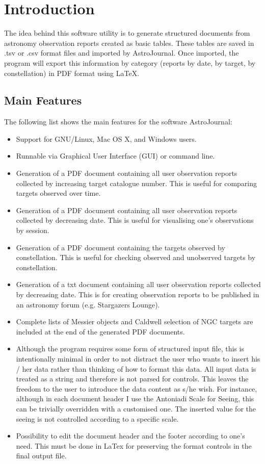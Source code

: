 \section{Introduction}
\label{sec:Introduction}
The idea behind this software utility is to generate structured documents 
from astronomy observation reports created as basic tables. These tables 
are saved in .tsv or .csv format files and imported by AstroJournal. Once imported, the program will export this information by category (reports by date, by target, by constellation) in PDF format using LaTeX.


\subsection{Main Features}
\label{subsec:Main Features}
The following list shows the main features for the software AstroJournal:
\begin{itemize}
 \item Support for GNU/Linux, Mac OS X, and Windows users.
 \item Runnable via Graphical User Interface (GUI) or command line.
 \item Generation of a PDF document containing all user observation reports collected by increasing target catalogue number. This is useful for comparing targets observed over time.
 \item Generation of a PDF document containing all user observation reports collected by decreasing date. This is useful for visualising one's observations by session.
 \item Generation of a PDF document containing the targets observed by constellation. This is useful for checking observed and unobserved targets by constellation.
 \item Generation of a txt document containing all user observation reports collected by decreasing date. This is for creating observation reports to be published in an astronomy forum (e.g. Stargazers Lounge).
 \item Complete lists of Messier objects and Caldwell selection of NGC targets are included at the end of the generated PDF documents.
 \item Although the program requires some form of structured input file, this is intentionally minimal in order to not distract the user who wants to insert his / her data rather than thinking of how to format this data. All input data is treated as a string and therefore is not parsed for controls. This leaves the freedom to the user to introduce the data content as s/he wish. For instance, although in each document header I use the Antoniadi Scale for Seeing, this can be trivially overridden with a customised one. The inserted value for the seeing is not controlled according to a specific scale.
 \item Possibility to edit the document header and the footer according to one's need. This must be done in LaTex for preserving the format controls in the final output file.
\end{itemize}


